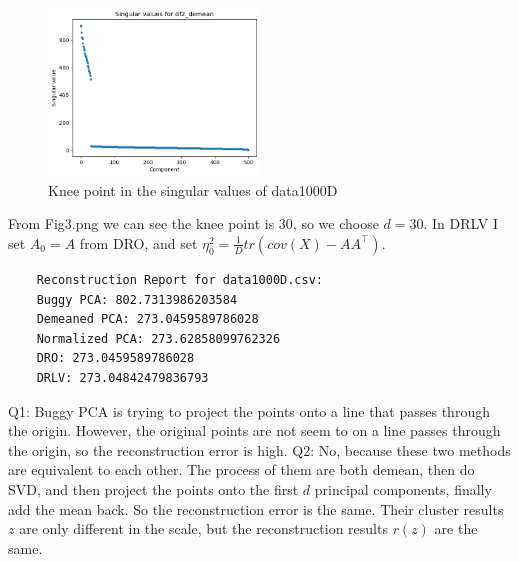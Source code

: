 \begin{soln}
  \begin{figure}[h]
    \centering
    \includegraphics[width=0.5\textwidth]{Fig3.png}
    \caption{Knee point in the singular values of data1000D}
    \label{fig:obj}
  \end{figure}
  From Fig3.png we can see the knee point is 30, so we choose $d=30$.
  In DRLV I set $A_0 = A$ from DRO, and set $\eta_0^2 = \frac{1}{D} tr(cov(X) - AA^\top)$.
  \begin{verbatim}
    Reconstruction Report for data1000D.csv:
    Buggy PCA: 802.7313986203584
    Demeaned PCA: 273.0459589786028
    Normalized PCA: 273.62858099762326
    DRO: 273.0459589786028
    DRLV: 273.04842479836793
  \end{verbatim}
    Q1: Buggy PCA is trying to project the points onto a line that passes through the origin. However, the original points are not seem to on a line passes through the origin, so the reconstruction error is high.
    Q2: No, because these two methods are equivalent to each other. The process of them are both demean, then do SVD, and then project the points onto the first $d$ principal components, finally add the mean back. So the reconstruction error is the same. Their cluster results $z$ are only different in the scale, but the reconstruction results $r(z)$ are the same.
\end{soln}


\vspace{0.2in}




